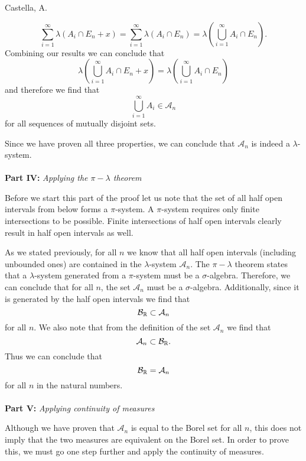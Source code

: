 \begin{solution}[3.19]{Castella, A.}
\begin{itemize}
        $$
            \sum_{i=1}^\infty \lambda(A_i \cap E_n + x) = \sum_{i=1}^\infty \lambda(A_i \cap E_n) = \lambda\left(\bigcup_{i=1}^\infty A_i\cap E_n\right).
        $$
        Combining our results we can conclude that
        $$
            \lambda\left(\bigcup_{i=1}^\infty A_i\cap E_n + x\right) = \lambda\left(\bigcup_{i=1}^\infty A_i\cap E_n\right)
        $$
        and therefore we find that
        $$
            \bigcup_{i=1}^\infty A_i \in \mathcal{A}_n
        $$
        for all sequences of mutually disjoint sets.
    \end{itemize}
    Since we have proven all three properties, we can conclude that $\mathcal{A}_n$ is indeed a $\lambda$-system.\\
    \\
    \textbf{Part IV:} \textit{Applying the $\pi-\lambda$ theorem}
    
    Before we start this part of the proof let us note that the set of all half open intervals from below forms a $\pi$-system. A $\pi$-system requires only finite intersections to be possible. Finite intersections of half open intervals clearly result in half open intervals as well.
    
    As we stated previously, for all $n$ we know that all half open intervals (including unbounded ones) are contained in the $\lambda$-system $\mathcal{A}_n$. The $\pi-\lambda$ theorem states that a $\lambda$-system generated from a $\pi$-system must be a $\sigma$-algebra. Therefore, we can conclude that for all $n$, the set $\mathcal{A}_n$ must be a $\sigma$-algebra. Additionally, since it is generated by the half open intervals we find that
    $$
        \mathcal B_{\mathbb R} \subset \mathcal{A}_n
    $$
    for all $n$. We also note that from the definition of the set $\mathcal{A}_n$ we find that
    $$
        \mathcal{A}_n \subset \mathcal B_{\mathbb R}.
    $$
    Thus we can conclude that
    $$
        \mathcal B_{\mathbb R} = \mathcal{A}_n
    $$
    for all $n$ in the natural numbers.\\
    \\
    \textbf{Part V:} \textit{Applying continuity of measures}
    
    Although we have proven that $\mathcal{A}_n$ is equal to the Borel set for all $n$, this does not imply that the two measures are equivalent on the Borel set. In order to prove this, we must go one step further and apply the continuity of measures.
    

\end{solution}
